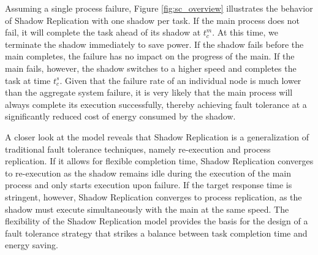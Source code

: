 Assuming a single process failure, Figure \ref{fig:sc_overview} illustrates the behavior of Shadow Replication with one shadow per task. 
If the main process does not fail, it will complete the task ahead of its shadow at $t_c^m$. At this time, we terminate the shadow immediately to save power. If the shadow fails before the main completes, the failure has no impact on the progress of the main. If the main fails, however, the shadow switches to a higher speed and completes the task at time $t_c^s$. 
Given that the failure rate of an individual node is much lower than
the aggregate system failure, it is very likely that the main process
will always complete its execution successfully, thereby achieving fault tolerance at a significantly reduced cost of energy consumed by the shadow. %


A closer look at the model reveals that Shadow
Replication is a generalization of traditional fault tolerance
techniques, namely re-execution and process replication. If it allows for flexible completion time, 
Shadow Replication converges to re-execution as
the shadow remains idle during the execution of the main process and
only starts execution upon failure. If the target response time is
stringent, however, Shadow Replication converges to process replication,
as the shadow must execute simultaneously with the main at the same
speed. The flexibility of the Shadow Replication model provides the
basis for the design of a fault tolerance strategy that strikes a
balance between task completion time and energy saving. 


